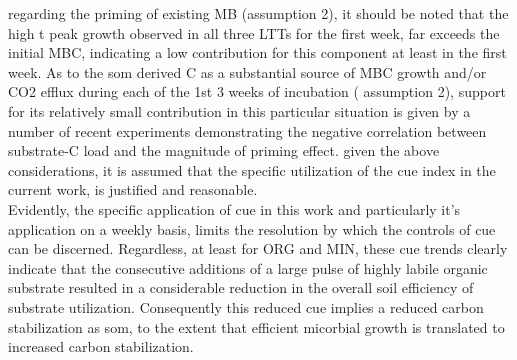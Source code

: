 \documentclass[12pt]{report}
\begin{document}
		regarding the priming of existing MB (assumption 2), it should be noted that the high t peak growth observed in all three LTTs for the first week, far exceeds the initial MBC, indicating a low contribution for this component at least in the first week.
		As to the \gls{som} derived C as a substantial source of MBC growth and/or CO2 efflux during each of the 1st 3 weeks of incubation ( assumption 2),  support for its relatively small contribution in this particular situation is given by a number of recent experiments demonstrating the negative correlation between substrate-C load and the magnitude of priming effect\citep{blagodatskaya2011, schneckenberger2008, wu1993}.
		given the above considerations, it is assumed that the specific utilization of the \gls{cue} index in the current work, is justified and reasonable.\\
		Evidently, the specific application of \gls{cue} in this work and particularly it's application on a weekly basis, limits the resolution by which the controls of \gls{cue} can be discerned. Regardless, at least for ORG and MIN, these \gls{cue} trends clearly indicate that the consecutive additions of a large pulse of highly labile organic substrate resulted in a considerable reduction in the overall soil efficiency of substrate utilization. Consequently this reduced \gls{cue} implies a reduced carbon stabilization as \gls{som}, to the extent that efficient micorbial growth is translated to increased carbon stabilization.
		
		\vspace{\textheight }
\end{document}
